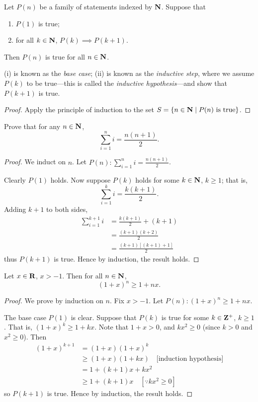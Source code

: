 \begin{theorem}\label{thrm:pmi}
Let $P(n)$ be a family of statements indexed by $\mathbf N$. Suppose that 
\begin{enumerate}[label=(\roman*)]
\item $P(1)$ is true;
\item for all $k\in\mathbf N$, $P(k)\implies P(k+1)$.
\end{enumerate}
Then $P(n)$ is true for all $n\in\mathbf N$.
\end{theorem}

(i) is known as the \emph{base case}; (ii) is known as the \emph{inductive step}, where we assume $P(k)$ to be true---this is called the \emph{inductive hypothesis}---and show that $P(k+1)$ is true.

\begin{proof}
Apply the principle of induction to the set $S=\{n\in\mathbf N\mid P(n)\text{ is true}\}$.
\end{proof}

\begin{exercise}
Prove that for any $n\in\mathbf N$,
\[\sum_{i=1}^n i=\frac{n(n+1)}{2}.\]
\end{exercise}

\begin{proof}
We induct on $n$. Let $\displaystyle P(n):\sum_{i=1}^n i=\frac{n(n+1)}{2}$.

Clearly $P(1)$ holds. Now suppose $P(k)$ holds for some $k\in\mathbf N$, $k\ge1$; that is,
\[\sum_{i=1}^k i=\frac{k(k+1)}{2}.\]
Adding $k+1$ to both sides,
\begin{align*}
\sum_{i=1}^{k+1} i&=\frac{k(k+1)}{2}+(k+1)\\
&=\frac{(k+1)(k+2)}{2}\\
&=\frac{(k+1)[(k+1)+1]}{2}
\end{align*}
thus $P(k+1)$ is true. Hence by induction, the result holds.
\end{proof}

\begin{exercise}
Let $x\in\mathbf R$, $x>-1$. Then for all $n\in\mathbf N$,
\[(1+x)^n\ge1+nx.\]
\end{exercise}

\begin{proof}
We prove by induction on $n$. Fix $x>-1$. Let $P(n):(1+x)^n\ge1+nx$.

The base case $P(1)$ is clear. Suppose that $P(k)$ is true for some $k\in\mathbf Z^+$, $k\ge1$. That is, $(1+x)^k\ge1+kx$. Note that $1+x>0$, and $kx^2\ge0$ (since $k>0$ and $x^2\ge0$). Then
\begin{align*}
(1+x)^{k+1}&=(1+x)(1+x)^k\\
&\ge(1+x)(1+kx)\quad\text{[induction hypothesis]}\\
&=1+(k+1)x+kx^2\\
&\ge1+(k+1)x\quad[\because kx^2\ge0]
\end{align*}
so $P(k+1)$ is true. Hence by induction, the result holds.
\end{proof}

